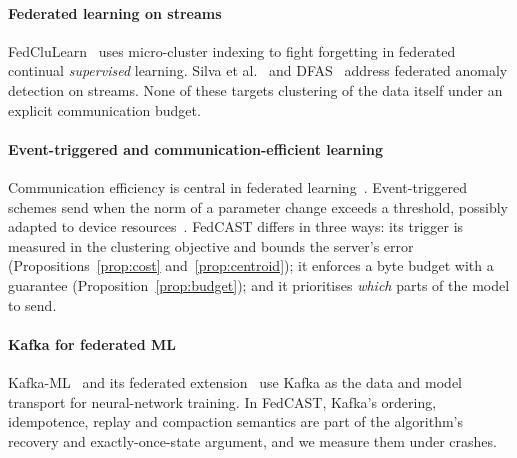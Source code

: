 \paragraph{Federated learning on streams} FedCluLearn~\cite{angelova2025fedclulearn} uses micro-cluster indexing to fight forgetting in federated continual \emph{supervised} learning. Silva et al.~\cite{silva2022federated} and DFAS~\cite{li2025dfas} address federated anomaly detection on streams. None of these targets clustering of the data itself under an explicit communication budget.

\paragraph{Event-triggered and communication-efficient learning} Communication efficiency is central in federated learning~\cite{mcmahan2017fedavg,kairouz2021advances}. Event-triggered schemes send when the norm of a parameter change exceeds a threshold, possibly adapted to device resources~\cite{ghosh2021eventgrad,zehtabi2022event}. FedCAST differs in three ways: its trigger is measured in the clustering objective and bounds the server's error (Propositions~\ref{prop:cost} and~\ref{prop:centroid}); it enforces a byte budget with a guarantee (Proposition~\ref{prop:budget}); and it prioritises \emph{which} parts of the model to send.

\paragraph{Kafka for federated ML} Kafka-ML~\cite{martin2022kafkaml} and its federated extension~\cite{carnerero2024kafkaml} use Kafka as the data and model transport for neural-network training. In FedCAST, Kafka's ordering, idempotence, replay and compaction semantics are part of the algorithm's recovery and exactly-once-state argument, and we measure them under crashes.
